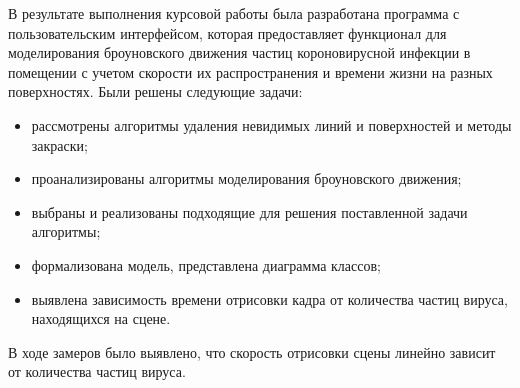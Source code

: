 \Conclusion %

В результате выполнения курсовой работы была разработана программа с пользовательским интерфейсом, которая предоставляет функционал для моделирования броуновского движения частиц короновирусной инфекции в помещении с учетом скорости их распространения и времени жизни на разных поверхностях.
Были решены следующие задачи:
\begin{itemize}
	\item рассмотрены алгоритмы удаления невидимых линий и поверхностей и методы закраски;
	\item проанализированы алгоритмы моделирования броуновского движения;
	\item выбраны и реализованы подходящие для решения поставленной задачи алгоритмы;
	\item формализована модель, представлена диаграмма классов;
	\item выявлена зависимость времени отрисовки кадра от количества частиц вируса, находящихся на сцене.
\end{itemize}

В ходе замеров было выявлено, что скорость отрисовки сцены линейно зависит от количества частиц вируса.